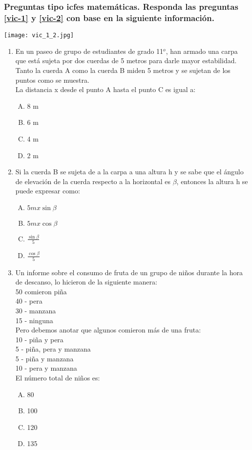 
\subsubsection*{Preguntas tipo icfes matem\'aticas. Responda las preguntas \ref{vic-1} y \ref{vic-2} con base en la siguiente informaci\'on.}

\texttt{[image: vic\_1\_2.jpg]}
\begin{enumerate}
\item En un paseo de grupo de estudiantes de grado 11$^o$, han armado una carpa que est\'a sujeta por dos cuerdas de 5 metros para darle mayor estabilidad. Tanto la cuerda A como la cuerda B  miden 5 metros y se sujetan de los puntos como se muestra. \label{vic-1}\\

La distancia x desde el punto A hasta el punto C es igual a:
\begin{enumerate}[(A)]
\item 8 m
\item 6 m 
\item 4 m 
\item 2 m
\end{enumerate}

\newpage
\item Si la cuerda B se sujeta de a la carpa a una altura h  y se sabe que el ángulo de elevación de la cuerda respecto a la horizontal es  $\beta$, entonces la altura h se puede expresar como:\label{vic-2}

\begin{enumerate}[(A)]
\item $5m x \sin\beta$
\item $5m x \cos\beta$
\item	$\frac{\sin\beta}{5}$
\item $\frac{\cos\beta}{5}$
\end{enumerate}
\item Un informe sobre el consumo de fruta de un grupo de niños durante la hora de descanso, lo hicieron de la siguiente \label{vic-3} manera:\\
50 comieron piña \\
40 - pera \\
30 - manzana\\
15 - ninguna\\
Pero debemos anotar que algunos comieron más de una fruta:\\
10 - piña y pera\\
5 - piña, pera y manzana\\
5 - piña y manzana\\
10 - pera y manzana\\
El número total de niños es:
\begin{enumerate}[(A)]
\item 80
\item 100
\item 120 
\item 135
\end{enumerate}



\end{enumerate}
